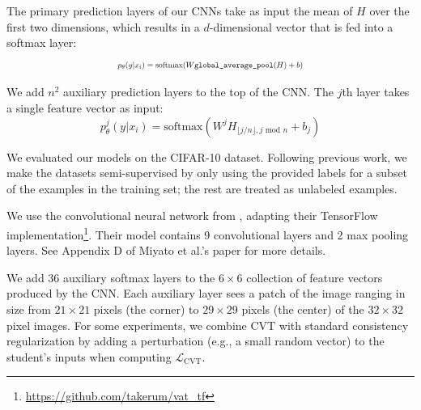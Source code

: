 \documentclass[11pt,a4paper]{article}
\newcommand{\xhdr}[1]{\vspace{1.7mm}\noindent{{\bf #1.}}}
\newcommand{\loss} { \mathcal{L} }
\newcommand{\lunsup} { \loss_\text{CVT} }
\newcommand{\model}[1]{ p_\theta(y|#1) }
\newcommand{\modelj}[1]{ p^j_\theta(y|#1) }
\begin{document}
The primary prediction layers of our CNNs take as input the mean of $H$ over the first two dimensions, which results in a $d$-dimensional vector that is fed into a softmax layer:
\[
\resizebox{0.49\textwidth}{!}{
$\model{x_i} = \text{softmax}(W\texttt{global\_average\_pool}(H) + b)$
}
\]

We add $n^2$ auxiliary prediction layers to the top of the CNN. The $j$th layer takes a single feature vector as input:
\[
\modelj{x_i} = \text{softmax}(W^j H_{\lfloor j / n \rfloor, j \text{ mod } n} + b_j)
\]

\xhdr{Data}
We evaluated our models on the CIFAR-10 \citep{krizhevsky2009learning} dataset. 
Following previous work, we make the datasets semi-supervised by only using the provided labels for a subset of the examples in the training set; the rest are treated as unlabeled examples.

\xhdr{Model} We use the convolutional neural network from \citet{miyato2017virtual}, adapting their TensorFlow implementation\footnote{\url{https://github.com/takerum/vat_tf}}.
Their model contains 9 convolutional layers and 2 max pooling layers. See Appendix D of Miyato et al.'s paper for more details.

We add 36 auxiliary softmax layers to the $6 \times 6$ collection of feature vectors produced by the CNN.
Each auxiliary layer sees a patch of the image ranging in size from $21 \times 21$ pixels (the corner) to $29 \times 29$ pixels (the center) of the $32 \times 32$ pixel images.
For some experiments, we combine CVT with standard consistency regularization by adding a perturbation (e.g., a small random vector) to the student's inputs when computing $\lunsup$. 
\end{document}
